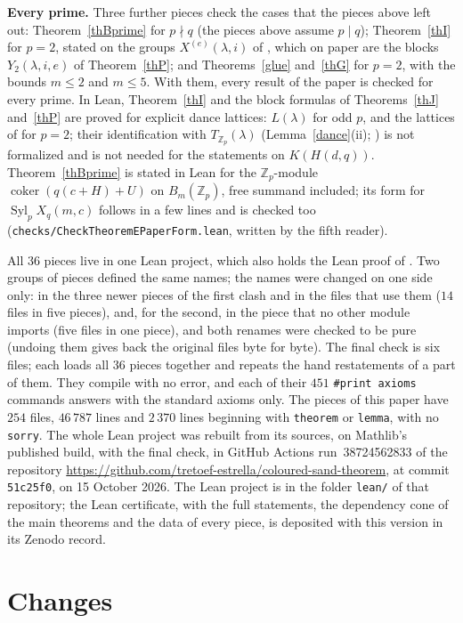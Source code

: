 \documentclass[10pt]{article}
\theoremstyle{ds}
\theoremstyle{dsrem}
\newcommand{\Z}{\mathbb{Z}}
\newcommand{\Syl}{\operatorname{Syl}}
\begin{document}
\textbf{Every prime.} Three further pieces check the cases that the pieces above left out: Theorem~\ref{thBprime} for $p\nmid q$ (the pieces above assume $p\mid q$); Theorem~\ref{thI} for $p=2$, stated on the groups $X^{(e)}(\lambda,i)$ of \cite{DST}, which on paper are the blocks $Y_2(\lambda,i,e)$ of Theorem~\ref{thP}; and Theorems~\ref{glue} and~\ref{thG} for $p=2$, with the bounds $m\le2$ and $m\le5$. With them, every result of the paper is checked for every prime. In Lean, Theorem~\ref{thI} and the block formulas of Theorems~\ref{thJ} and~\ref{thP} are proved for explicit dance lattices: $L(\lambda)$ for odd $p$, and the lattices of \cite{DST} for $p=2$; their identification with $T_{\Z_p}(\lambda)$ (Lemma~\ref{dance}(ii); \cite[Remark~(1) after Theorem~3.6]{DST}) is not formalized and is not needed for the statements on $K(H(d,q))$. Theorem~\ref{thBprime} is stated in Lean for the $\Z_p$-module $\operatorname{coker}(q(c+H)+U)$ on $B_m(\Z_p)$, free summand included; its form for $\Syl_pX_q(m,c)$ follows in a few lines and is checked too (\texttt{checks/CheckTheoremEPaperForm.lean}, written by the fifth reader).

All $36$ pieces live in one Lean project, which also holds the Lean proof of \cite{DST}. Two groups of pieces defined the same names; the names were changed on one side only: in the three newer pieces of the first clash and in the files that use them ($14$ files in five pieces), and, for the second, in the piece that no other module imports (five files in one piece), and both renames were checked to be pure (undoing them gives back the original files byte for byte). The final check is six files; each loads all $36$ pieces together and repeats the hand restatements of a part of them. They compile with no error, and each of their $451$ \texttt{\#print axioms} commands answers with the standard axioms only. The pieces of this paper have $254$ files, $46\,787$ lines and $2\,370$ lines beginning with \texttt{theorem} or \texttt{lemma}, with no \texttt{sorry}. The whole Lean project was rebuilt from its sources, on Mathlib's published build, with the final check, in GitHub Actions run~38724562833 of the repository \url{https://github.com/tretoef-estrella/coloured-sand-theorem}, at commit \texttt{51c25f0}, on 15 October 2026. The Lean project is in the folder \texttt{lean/} of that repository; the Lean certificate, with the full statements, the dependency cone of the main theorems and the data of every piece, is deposited with this version in its Zenodo record.

\section{Changes}\label{sec:changes}
\end{document}
